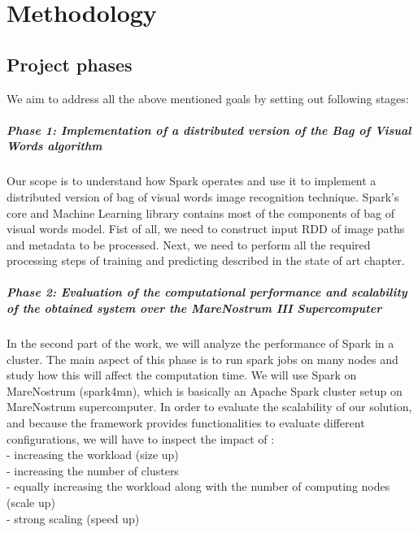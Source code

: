 \chapter{Methodology}

\ifpdf
    \graphicspath{{Chapter3/Figs/Raster/}{Chapter3/Figs/PDF/}{Chapter3/Figs/}}
\else
    \graphicspath{{Chapter3/Figs/Vector/}{Chapter3/Figs/}}
\fi

\section{Project phases}
We aim to address all the above mentioned goals by setting out following stages:

\paragraph{Phase 1: Implementation of a distributed version of the Bag of Visual Words algorithm}

Our scope is to understand how Spark operates and use it to implement a distributed version of bag of visual words image recognition technique. Spark's core and Machine Learning library contains most of the components of bag of visual words model. Fist of all, we need to construct input RDD of image paths and metadata to be processed. Next, we need to perform all the required processing steps of training and predicting described in the state of art chapter. 

\paragraph{Phase 2: Evaluation of the computational performance and scalability of the obtained system over the MareNostrum III Supercomputer}

In the second part of the work, we will analyze the performance of Spark in a cluster. The main aspect of this phase is to run spark jobs on many nodes and study how this will affect the computation time. We will use Spark on MareNostrum (spark4mn), which is basically an Apache Spark cluster setup on MareNostrum supercomputer. In order to evaluate the scalability of our solution, and because the framework provides functionalities to evaluate different configurations, we will have to inspect the impact of : \\
- increasing the workload (size up) \\
- increasing the number of clusters \\
- equally increasing the workload along with the number of computing nodes (scale up) \\
- strong scaling (speed up)\\

